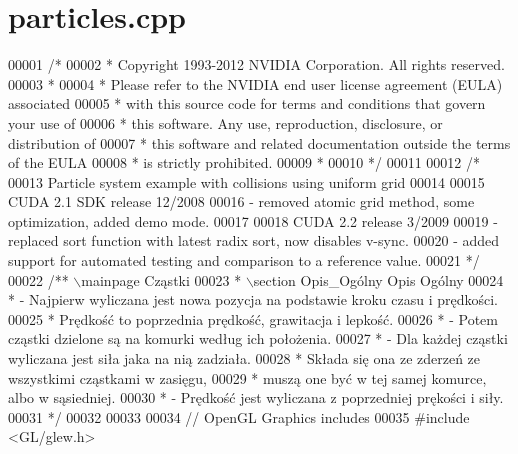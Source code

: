 \hypertarget{particles_8cpp_source}{\section{particles.\-cpp}
}

\begin{DoxyCode}
00001 \textcolor{comment}{/*}
00002 \textcolor{comment}{ * Copyright 1993-2012 NVIDIA Corporation.  All rights reserved.}
00003 \textcolor{comment}{ *}
00004 \textcolor{comment}{ * Please refer to the NVIDIA end user license agreement (EULA) associated}
00005 \textcolor{comment}{ * with this source code for terms and conditions that govern your use of}
00006 \textcolor{comment}{ * this software. Any use, reproduction, disclosure, or distribution of}
00007 \textcolor{comment}{ * this software and related documentation outside the terms of the EULA}
00008 \textcolor{comment}{ * is strictly prohibited.}
00009 \textcolor{comment}{ *}
00010 \textcolor{comment}{ */}
00011 
00012 \textcolor{comment}{/*}
00013 \textcolor{comment}{    Particle system example with collisions using uniform grid}
00014 \textcolor{comment}{}
00015 \textcolor{comment}{    CUDA 2.1 SDK release 12/2008}
00016 \textcolor{comment}{    - removed atomic grid method, some optimization, added demo mode.}
00017 \textcolor{comment}{}
00018 \textcolor{comment}{    CUDA 2.2 release 3/2009}
00019 \textcolor{comment}{    - replaced sort function with latest radix sort, now disables v-sync.}
00020 \textcolor{comment}{    - added support for automated testing and comparison to a reference value.}
00021 \textcolor{comment}{*/}
00022 \textcolor{comment}{/** \(\backslash\)mainpage Cząstki}
00023 \textcolor{comment}{ * \(\backslash\)section Opis\_Ogólny Opis Ogólny}
00024 \textcolor{comment}{ * - Najpierw wyliczana jest nowa pozycja na podstawie kroku czasu i prędkości.}
00025 \textcolor{comment}{ * Prędkość to poprzednia prędkość, grawitacja i lepkość.}
00026 \textcolor{comment}{ * - Potem cząstki dzielone są na komurki według ich położenia.}
00027 \textcolor{comment}{ * - Dla każdej cząstki wyliczana jest siła jaka na nią zadziała.}
00028 \textcolor{comment}{ * Składa się ona ze zderzeń ze wszystkimi cząstkami w zasięgu,}
00029 \textcolor{comment}{ * muszą one być w tej samej komurce, albo w sąsiedniej.}
00030 \textcolor{comment}{ * - Prędkość jest wyliczana z poprzedniej prękości i siły.}
00031 \textcolor{comment}{ */}
00032 
00033 
00034 \textcolor{comment}{// OpenGL Graphics includes}
00035 \textcolor{preprocessor}{#}\textcolor{preprocessor}{include} \textcolor{preprocessor}{<}\textcolor{preprocessor}{GL}\textcolor{preprocessor}{/}\textcolor{preprocessor}{glew}\textcolor{preprocessor}{.}\textcolor{preprocessor}{h}\textcolor{preprocessor}{>}

\end{DoxyCode}
